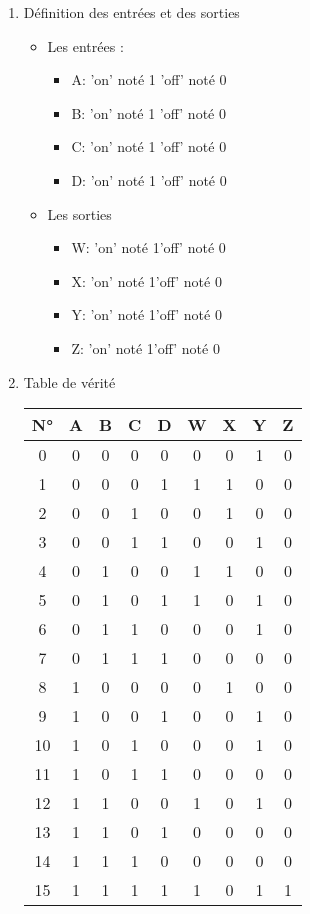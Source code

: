 \begin{enumerate}
 \item Définition des entrées et des sorties 
         \begin{itemize}
         \item Les entrées :
         \begin{itemize}
         \item A: \qquad 'on' noté 1 \qquad 'off' noté 0
 \item B: \qquad 'on' noté 1 \qquad 'off' noté 0
 \item C: \qquad 'on' noté 1 \qquad 'off' noté 0
 \item D: \qquad 'on' noté 1 \qquad 'off' noté 0
 \end{itemize}
          \item  Les sorties 
          \begin{itemize}
          \item W: \qquad 'on' noté 1\qquad 'off' noté  0
\item X: \qquad 'on' noté 1\qquad 'off' noté  0
\item Y: \qquad 'on' noté 1\qquad 'off' noté  0
\item Z: \qquad 'on' noté 1\qquad 'off' noté  0
\end{itemize}
         \end{itemize}\item Table de vérité \\%
        \begin{tabular}{|c|c|c|c|c||c|c|c|c|}
    \toprule
        N° &A & B & C & D & W & X & Y & Z\\ \midrule0 & 0 & 0 & 0 & 0 & 0 & 0 & 1 & 0\\1 & 0 & 0 & 0 & 1 & 1 & 1 & 0 & 0\\2 & 0 & 0 & 1 & 0 & 0 & 1 & 0 & 0\\3 & 0 & 0 & 1 & 1 & 0 & 0 & 1 & 0\\\midrule4 & 0 & 1 & 0 & 0 & 1 & 1 & 0 & 0\\5 & 0 & 1 & 0 & 1 & 1 & 0 & 1 & 0\\6 & 0 & 1 & 1 & 0 & 0 & 0 & 1 & 0\\7 & 0 & 1 & 1 & 1 & 0 & 0 & 0 & 0\\\midrule8 & 1 & 0 & 0 & 0 & 0 & 1 & 0 & 0\\9 & 1 & 0 & 0 & 1 & 0 & 0 & 1 & 0\\10 & 1 & 0 & 1 & 0 & 0 & 0 & 1 & 0\\11 & 1 & 0 & 1 & 1 & 0 & 0 & 0 & 0\\\midrule12 & 1 & 1 & 0 & 0 & 1 & 0 & 1 & 0\\13 & 1 & 1 & 0 & 1 & 0 & 0 & 0 & 0\\14 & 1 & 1 & 1 & 0 & 0 & 0 & 0 & 0\\15 & 1 & 1 & 1 & 1 & 1 & 0 & 1 & 1\\\bottomrule

\end{tabular}
\end{enumerate}
